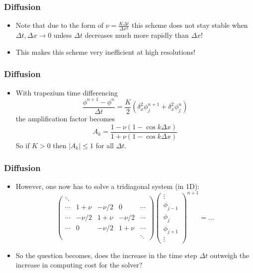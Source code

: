 \documentclass[aspectratio=149,9pt]{beamer}
\begin{document}
%
%
\begin{frame}
	\frametitle{Diffusion}
	\begin{itemize}
		\item Note that due to the form of $\nu = \frac{K \Delta t}{\Delta x^2}$ this scheme does not stay stable when $\Delta t, \Delta x \rightarrow 0$
	unless $\Delta t$ decreases much more rapidly than $\Delta x$!\vspace*{2ex}
		\item This makes this scheme very inefficient at high resolutions!
	\end{itemize}
\end{frame}
%
%
\begin{frame}
	\frametitle{Diffusion}
	\begin{itemize}
		\item With trapezium time differencing
		\begin{equation*}
			\frac{\phi^{n+1} - \phi^n}{\Delta t} =\frac{K}{2}\left(\delta_x^2 \phi^{n+1}_j + \delta_x^2 \phi^n_j\right)
		\end{equation*}
		the amplification factor becomes
		\begin{equation*}
			A_k = \frac{1 - \nu \left( 1 - \cos k \Delta x \right)}	{1 + \nu \left( 1 - \cos k \Delta x \right)}
		\end{equation*}
		So if $K > 0$ then  $| A_k | \le 1$ for	all $\Delta t$.
	\end{itemize}
\end{frame}
%
%
\begin{frame}
	\frametitle{Diffusion}
	\begin{itemize}
		\item However, one now has to solve a tridiagonal system (in 1D):
			\begin{equation*}
				\left(\begin{array}{ccccc}
					\ddots\\
					\cdots & 1+\nu &-\nu/2 & 0 & \cdots \\
					\cdots & -\nu/2 & 1+\nu & -\nu/2 & \cdots \\
					\cdots & 0 & -\nu/2 & 1+\nu & \cdots \\
					&&&&\ddots
				\end{array}\right)\left(\begin{array}{c}\vdots \\ \phi_{j-1} \\ \phi_j \\ \phi_{j+1} \\ \vdots \end{array}\right)^{n+1}
					= \ldots
			\end{equation*}\vspace*{2ex}
		\item So the question becomes, does the increase in the  time step $\Delta t$ outweigh the increase in computing cost for the solver?
	\end{itemize}
\end{frame}
\end{document}
